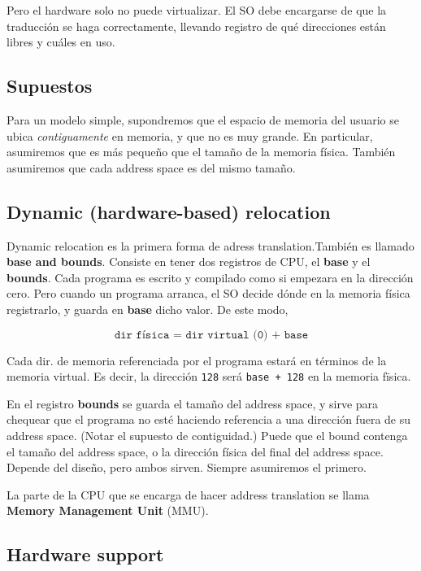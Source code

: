 \documentclass[12pt]{article}
\theoremstyle{definition}
\begin{document}
Pero el hardware solo no puede virtualizar. El SO debe encargarse de que la
traducción se haga correctamente, llevando registro de qué direcciones están
libres y cuáles en uso. 


\subsection{Supuestos}

Para un modelo simple, supondremos que el espacio de memoria del usuario se
ubica \textit{contiguamente} en memoria, y que no es muy grande. En particular,
asumiremos que es más pequeño que el tamaño de la memoria física. También
asumiremos que cada address space es del mismo tamaño. 

\subsection{Dynamic (hardware-based) relocation}

Dynamic relocation es la primera forma de adress translation.También es llamado
\textbf{base and bounds}. Consiste en tener dos registros de CPU, el
\textbf{base} y el \textbf{bounds}. Cada programa es escrito y compilado como si
empezara en la dirección cero. Pero cuando un programa arranca, el SO decide
dónde en la memoria física registrarlo, y guarda en \textbf{base} dicho valor.
De este modo, 

\begin{equation*}
\texttt{dir física = dir virtual (0) + base}
\end{equation*}

Cada dir. de memoria referenciada por el programa estará en términos de la
memoria virtual. Es decir, la dirección \texttt{128} será \texttt{base + 128}
en la memoria fïsica.

En el registro \textbf{bounds} se guarda el tamaño del address space, y sirve
para chequear que el programa no esté haciendo referencia a una dirección fuera
de su address space. (Notar el supuesto de contiguidad.) Puede que el bound
contenga el tamaño del address space, o la dirección física del final del
address space. Depende del diseño, pero ambos sirven. Siempre asumiremos el
primero.

La parte de la CPU que se encarga de hacer address translation se llama
\textbf{Memory Management Unit} (MMU).

\subsection{Hardware support}
\end{document}
